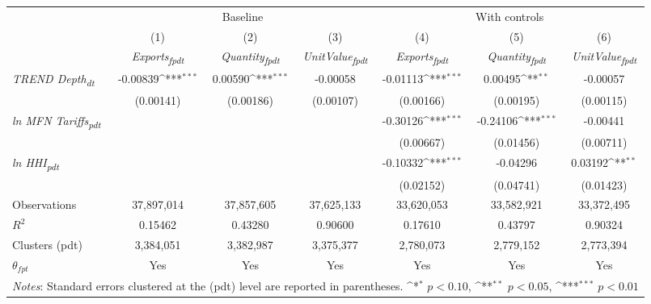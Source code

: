 {
\def\sym#1{\ifmmode^{#1}\else\(^{#1}\)\fi}
\begin{tabular}{l*{6}{c}}
\toprule
&\multicolumn{3}{c}{Baseline}&\multicolumn{3}{c}{With controls}\\\cmidrule(lr){2-4}\cmidrule(lr){5-7}
&(1)&(2)&(3)&(4)&(5)&(6)\\
&\textit{Exports\textsubscript{fpdt}}&\textit{Quantity\textsubscript{fpdt}}&\textit{UnitValue\textsubscript{fpdt}}&\textit{Exports\textsubscript{fpdt}}&\textit{Quantity\textsubscript{fpdt}}&\textit{UnitValue\textsubscript{fpdt}}\\
\midrule
\textit{TREND Depth\textsubscript{dt}} & -0.00839\sym{***} & 0.00590\sym{***} & -0.00058 & -0.01113\sym{***} & 0.00495\sym{**} & -0.00057\\
 & (0.00141) & (0.00186) & (0.00107) & (0.00166) & (0.00195) & (0.00115)\\
\addlinespace
\textit{ln MFN Tariffs\textsubscript{pdt}} &  &  &  & -0.30126\sym{***} & -0.24106\sym{***} & -0.00441\\
 &  &  &  & (0.00667) & (0.01456) & (0.00711)\\
\addlinespace
\textit{ln HHI\textsubscript{pdt}} &  &  &  & -0.10332\sym{***} & -0.04296 & 0.03192\sym{**}\\
 &  &  &  & (0.02152) & (0.04741) & (0.01423)\\
\midrule
Observations & 37,897,014 & 37,857,605 & 37,625,133 & 33,620,053 & 33,582,921 & 33,372,495\\
$R^{2}$ & 0.15462 & 0.43280 & 0.90600 & 0.17610 & 0.43797 & 0.90324\\
Clusters (pdt) & 3,384,051 & 3,382,987 & 3,375,377 & 2,780,073 & 2,779,152 & 2,773,394\\
$\theta_{fpt}$ & Yes & Yes & Yes & Yes & Yes & Yes\\
\bottomrule
\multicolumn{7}{l}{\footnotesize \textit{Notes}: Standard errors clustered at the (pdt) level are reported in parentheses. \sym{*} \(p<0.10\), \sym{**} \(p<0.05\), \sym{***} \(p<0.01\)}\\
\end{tabular}
}

